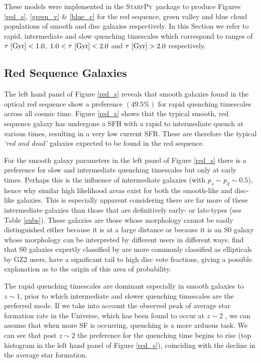 \documentclass[useAMS,usenatbib]{mn2e}
\def\changed    {\color{titlecol} }
\def\starfpy {\textsc{StarfPy}}
\begin{document}
{\changed These models were implemented in the \starfpy ~package to produce Figures \ref{red_s}, \ref{green_v} \& \ref{blue_c} for the red sequence, green valley and blue cloud populations of smooth and disc galaxies respectively.} In this Section we refer to rapid, intermediate and slow quenching timescales which correspond to ranges of {\changed $\tau ~\rm{[Gyr]} < 1.0$, $1.0 < \tau ~\rm{[Gyr]} < 2.0$ and $\tau ~\rm{[Gyr]} > 2.0$} respectively. 



\subsection{Red Sequence Galaxies}\label{rs}


The left hand panel of Figure \ref{red_s} reveals that smooth galaxies found in the optical red sequence {\changed show a preference $(49.5\%)$} for rapid quenching timescales across all cosmic time. Figure \ref{red_s} shows that the typical smooth, red sequence galaxy has undergone a SFH with a rapid to intermediate quench at various times, resulting in a very low current SFR. These are therefore the typical \emph{`red and dead'} galaxies expected to be found in the red sequence. 

{\changed For the smooth galaxy parameters in the left panel of Figure \ref{red_s} there is a preference for slow and intermediate quenching timescales but only at early times. Perhaps this is the influence of intermediate galaxies (with $p_s \sim p_d \sim 0.5$), hence why similar high likelihood areas exist for both the smooth-like and disc-like galaxies}. This is especially apparent considering there are far more of these intermediate galaxies than those that are definitively early- or late-types (see Table \ref{subs}). These galaxies are those whose morphology cannot be easily distinguished either because it is at a large distance or because it is an S0 galaxy whose morphology can be interpreted by different users in different ways. \citet{GZ2} find that S0 galaxies expertly classified by \citet{NA10} are more commonly classified as ellipticals by GZ2 users, have a significant tail to high disc vote fractions, giving a possible explanation as to the origin of this area of probability.

{ \changed The rapid quenching timescales are dominant especially in smooth galaxies to $z \sim 1$, prior to which intermediate and slower quenching timescales are the preferred mode. If we take into account the observed peak of average star formation rate in the Universe, which has been found to occur at $z\sim2$ \citep{Hopkins04}, we can assume that when more SF is occurring, quenching is a more arduous task. We can see that post $z\sim2$ the preference for the quenching time begins to rise (top histogram in the left hand panel of Figure \ref{red_s}), coinciding with the decline in the average star formation.}
\end{document}
